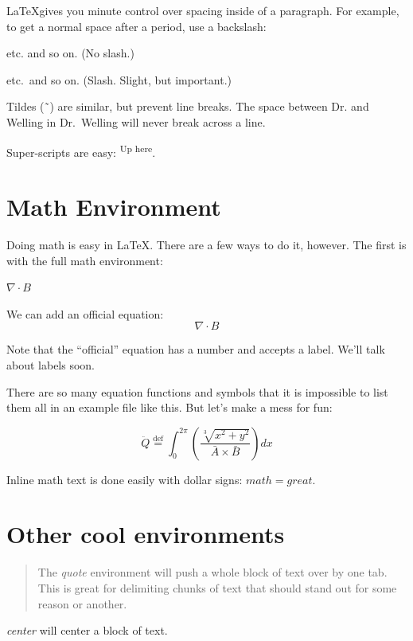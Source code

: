 \documentclass[12pt, letterpaper]{article}
\begin{document}
\LaTeX gives you minute control over spacing inside of a paragraph.  For 
example, to get a normal space after a period, use a backslash:

etc. and so on. (No slash.)

etc.\ and so on. (Slash.  Slight, but important.)

Tildes (\~\ ) are similar, but prevent line breaks.  The space between Dr. and
Welling in Dr.~Welling will never break across a line.

Super-scripts are easy:  \textsuperscript{Up here}.
\

\section{Math Environment}
Doing math is easy in \LaTeX.  There are a few ways to do it, however.  The
first is with the full math environment:

\begin{math}  
  \nabla \cdot B
\end{math}

We can add an official equation:
\begin{equation}
  \label{eq:1}
  \nabla \cdot B
\end{equation}

Note that the ``official'' equation has a number and accepts a label.  
We'll talk about labels soon.

There are so many equation functions and symbols that it is impossible to list 
them all in an example file like this.  But let's make a mess for fun:

\[
\ddot{Q}\stackrel{\mathrm{def}}{=}\int_{0}^{2\pi} 
\left( \frac{\sqrt[3]{x^2+y^2}}{\bar{A}\times\bar{B}} \right) dx
\]

Inline math text is done easily with dollar signs: $math=great$.

\section{Other cool environments}

\begin{quote}
  The \emph{quote} environment will push a whole block of text over by one tab. 
  This is great for delimiting chunks of text that should stand out for some 
  reason or another.
\end{quote}

\begin{center}
  \emph{center} will center a block of text.
\end{center}
\end{document}
